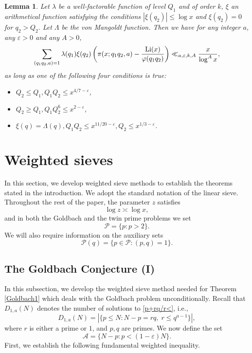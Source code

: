 \documentclass[12pt, a4paper]{amsart}
\def\Li{\hbox{{\rm Li}}}
\def\leq{\leqslant}
\def\geq{\geqslant}
\def\le{\leqslant}
\theoremstyle{plain}
\newtheorem{lemma}[proposition]{Lemma}
\theoremstyle{remark}
\numberwithin{equation}{section}
\begin{document}
\begin{lemma}\label{Fouvry-level}
Let $\lambda$ be a well-factorable function of level $Q_1$ and of order $k$, $\xi$ an arithmetical function 
satisfying the conditions 
$
|\xi(q_2)| \leq \log x
$
and
$\xi(q_2) = 0
$
for
$
q_2 > Q_2.
$
Let $\Lambda$ be the von Mangoldt function. Then we have for any integer $a$, any $\varepsilon > 0$ and any $A > 0$,  
$$
\sum_{\substack{(q_1q_2, a)=1}} \lambda(q_1)\xi(q_2) \left( \pi(x; q_1 q_2, a) - \frac{\Li(x)}{\varphi(q_1 q_2)} \right) \ll_{a, \varepsilon, k, A} 
\frac{x}{\log^A x},
$$  
as long as one of the following four conditions is true:  
\begin{itemize}
\item[(C.1)] $Q_2 \leq Q_1, Q_1 Q_2 \leq x^{4/7 - \varepsilon}$,  
\item[(C.2)] $Q_2 \geq Q_1, Q_1 Q_2^6 \leq x^{2 - \varepsilon}$,  
\item[(C.3)] $\xi(q) = \Lambda(q), Q_1 Q_2 \leq x^{11/20 - \varepsilon}, Q_2 \leq x^{1/3 - \varepsilon}$.
\end{itemize}  
\end{lemma}
	
\section{Weighted sieves}\label{sec4}

In this section, we develop weighted sieve methods to establish the theorems 
stated in the introduction.  
We adopt the standard notation of the linear sieve. Throughout the rest of the paper, the parameter \(z\) satisfies  
\begin{equation}\label{Cond/z}
\log z\asymp \log x, 
\end{equation}
and in both the Goldbach and the twin prime problems we set  
\begin{equation}\label{Def/P}
\mathscr{P}=\{p: p>2\}. 
\end{equation}
We will also require information on the auxiliary sets  
\begin{equation}\label{Def/Pq}
\mathscr{P}(q)=\{p \in \mathscr{P}: (p, q)=1\}. 
\end{equation} 

\subsection{The Goldbach Conjecture (I)}
In this subsection, we develop the weighted sieve method needed for Theorem \ref{Goldbach1}
which deals with the Goldbach problem unconditionally.  
Recall that \( D_{1,a}(N) \) denotes the number of solutions to \eqref{p+rq/r<}, i.e.,  
\begin{equation}\label{D1a}
D_{1,a}(N) = |\{ p \le N : N - p = r q,\; r \le q^{a-1} \}|,
\end{equation}
where \( r \) is either a prime or \( 1 \), and \( p, q \) are primes.  
We now define the set  
\begin{equation}\label{Def/A=Goldbach}
\mathscr{A} = \{ N - p : p < (1-\varepsilon)N \}.
\end{equation}
First, we establish the following fundamental weighted inequality.
\end{document}
